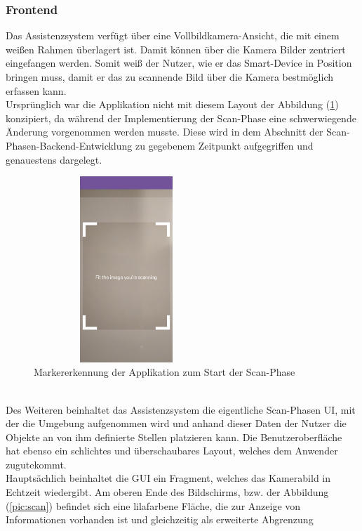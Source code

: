 \subsubsection{Frontend}
Das Assistenzsystem verfügt über eine Vollbildkamera-Ansicht, die mit einem weißen Rahmen überlagert ist. Damit können über die Kamera Bilder zentriert 
eingefangen werden. Somit weiß der Nutzer, wie er das Smart-Device in Position bringen muss, damit er das zu scannende Bild über die Kamera 
bestmöglich erfassen kann. 
\\ 
\linebreak
Ursprünglich war die Applikation nicht mit diesem Layout der Abbildung (\ref{pic:image_tracking}) konzipiert, da während der Implementierung der Scan-Phase eine 
schwerwiegende Änderung vorgenommen werden musste. Diese wird in dem Abschnitt der Scan-Phasen-Backend-Entwicklung zu gegebenem Zeitpunkt 
aufgegriffen und genauestens dargelegt. 
\begin{figure}[hbt!]
    \centering
    \includegraphics[width=7cm,height=7cm,keepaspectratio]{4Umsetzung/Bilder/image_tracking.jpg}
    \caption{Markererkennung der Applikation zum Start der Scan-Phase}
    \label{pic:image_tracking}
\end{figure}
\pagebreak 
\\
Des Weiteren beinhaltet das Assistenzsystem die eigentliche Scan-Phasen \acs{UI}, mit der die Umgebung aufgenommen wird und anhand dieser Daten 
der Nutzer die Objekte an von ihm definierte Stellen platzieren kann. Die Benutzeroberfläche hat ebenso ein schlichtes und überschaubares Layout, 
welches dem Anwender zugutekommt. 
\\ 
Hauptsächlich beinhaltet die \acs{GUI} ein Fragment, welches das Kamerabild in Echtzeit wiedergibt. Am oberen Ende des Bildschirms, bzw. der Abbildung 
(\ref{pic:scan}) befindet sich eine lilafarbene Fläche, die zur Anzeige von Informationen vorhanden ist und gleichzeitig als erweiterte Abgrenzung 
